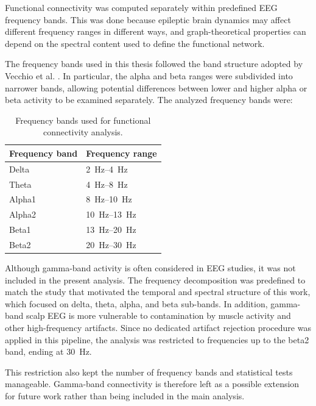 Functional connectivity was computed separately within predefined EEG frequency
bands. This was done because epileptic brain dynamics may affect different
frequency ranges in different ways, and graph-theoretical properties can depend
on the spectral content used to define the functional network.

The frequency bands used in this thesis followed the band structure adopted by
Vecchio et al. \cite{Vecchio2016}. In particular, the alpha and beta ranges were
subdivided into narrower bands, allowing potential differences between lower and
higher alpha or beta activity to be examined separately. The analyzed frequency
bands were:

\begin{table}[H]
    \centering
    \begin{tabular}{ll}
        \toprule
        Frequency band & Frequency range \\
        \midrule
        Delta & \SIrange{2}{4}{\hertz} \\
        Theta & \SIrange{4}{8}{\hertz} \\
        Alpha1 & \SIrange{8}{10}{\hertz} \\
        Alpha2 & \SIrange{10}{13}{\hertz} \\
        Beta1 & \SIrange{13}{20}{\hertz} \\
        Beta2 & \SIrange{20}{30}{\hertz} \\
        \bottomrule
    \end{tabular}
    \caption{Frequency bands used for functional connectivity analysis.}
    \label{tab:frequency-bands}
\end{table}

Although gamma-band activity is often considered in EEG studies, it was not
included in the present analysis. The frequency decomposition was predefined to
match the study that motivated the temporal and spectral structure of this
work, which focused on delta, theta, alpha, and beta sub-bands. In addition,
gamma-band scalp EEG is more vulnerable to contamination by muscle activity and
other high-frequency artifacts. Since no dedicated artifact rejection procedure
was applied in this pipeline, the analysis was restricted to frequencies up to
the beta2 band, ending at \SI{30}{\hertz}.

This restriction also kept the number of frequency bands and statistical tests
manageable. Gamma-band connectivity is therefore left as a possible extension
for future work rather than being included in the main analysis.